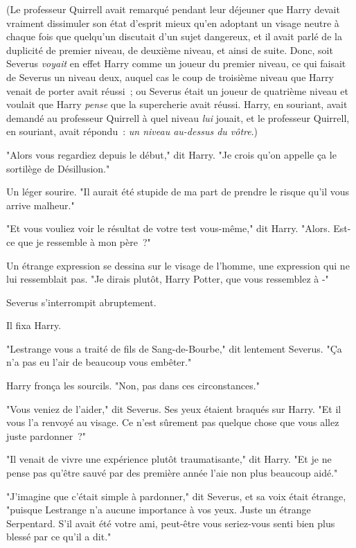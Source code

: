 (Le professeur Quirrell avait remarqué pendant leur déjeuner que Harry devait vraiment dissimuler son état d'esprit mieux qu'en adoptant un visage neutre à chaque fois que quelqu'un discutait d'un sujet dangereux, et il avait parlé de la duplicité de premier niveau, de deuxième niveau, et ainsi de suite. Donc, soit Severus \emph{voyait} en effet Harry comme un joueur du premier niveau, ce qui faisait de Severus un niveau deux, auquel cas le coup de troisième niveau que Harry venait de porter avait réussi~; ou Severus était un joueur de quatrième niveau et voulait que Harry \emph{pense} que la supercherie avait réussi. Harry, en souriant, avait demandé au professeur Quirrell à quel niveau \emph{lui} jouait, et le professeur Quirrell, en souriant, avait répondu~: \emph{un niveau au-dessus du vôtre}.)

"Alors vous regardiez depuis le début," dit Harry. "Je crois qu'on appelle ça le sortilège de Désillusion."

Un léger sourire. "Il aurait été stupide de ma part de prendre le risque qu'il vous arrive malheur."

"Et vous vouliez voir le résultat de votre test vous-même," dit Harry. "Alors. Est-ce que je ressemble à mon père~?"

Un étrange expression se dessina sur le visage de l'homme, une expression qui ne lui ressemblait pas. "Je dirais plutôt, Harry Potter, que vous ressemblez à -"

Severus s'interrompit abruptement.

Il fixa Harry.

"Lestrange vous a traité de fils de Sang-de-Bourbe," dit lentement Severus. "Ça n'a pas eu l'air de beaucoup vous embêter."

Harry fronça les sourcils. "Non, pas dans ces circonstances."

"Vous veniez de l'aider," dit Severus. Ses yeux étaient braqués sur Harry. "Et il vous l'a renvoyé au visage. Ce n'est sûrement pas quelque chose que vous allez juste pardonner~?"

"Il venait de vivre une expérience plutôt traumatisante," dit Harry. "Et je ne pense pas qu'être sauvé par des première année l'aie non plus beaucoup aidé."

"J'imagine que c'était simple à pardonner," dit Severus, et sa voix était étrange, "puisque Lestrange n'a aucune importance à vos yeux. Juste un étrange Serpentard. S'il avait été votre ami, peut-être vous seriez-vous senti bien plus blessé par ce qu'il a dit."

